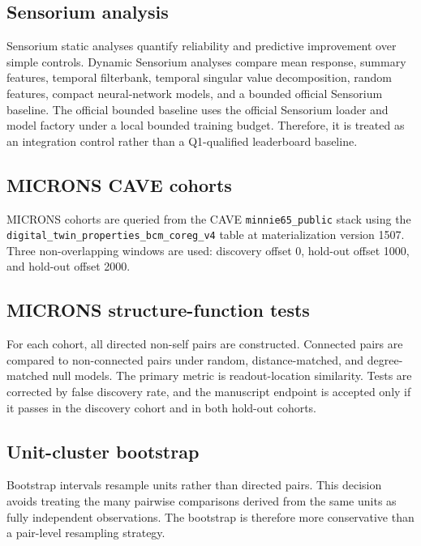 \subsection{Sensorium analysis}

Sensorium static analyses quantify reliability and predictive improvement over
simple controls. Dynamic Sensorium analyses compare mean response, summary
features, temporal filterbank, temporal singular value decomposition, random
features, compact neural-network models, and a bounded official Sensorium
baseline. The official bounded baseline uses the official Sensorium loader and
model factory under a local bounded training budget. Therefore, it is treated as
an integration control rather than a Q1-qualified leaderboard baseline.

\subsection{MICRONS CAVE cohorts}

MICRONS cohorts are queried from the CAVE \texttt{minnie65\_public} stack using
the \texttt{digital\_twin\_properties\_bcm\_coreg\_v4} table at materialization
version 1507. Three non-overlapping windows are used: discovery offset 0,
hold-out offset 1000, and hold-out offset 2000.

\subsection{MICRONS structure-function tests}

For each cohort, all directed non-self pairs are constructed. Connected pairs
are compared to non-connected pairs under random, distance-matched, and
degree-matched null models. The primary metric is readout-location similarity.
Tests are corrected by false discovery rate, and the manuscript endpoint is
accepted only if it passes in the discovery cohort and in both hold-out cohorts.

\subsection{Unit-cluster bootstrap}

Bootstrap intervals resample units rather than directed pairs. This decision
avoids treating the many pairwise comparisons derived from the same units as
fully independent observations. The bootstrap is therefore more conservative
than a pair-level resampling strategy.
